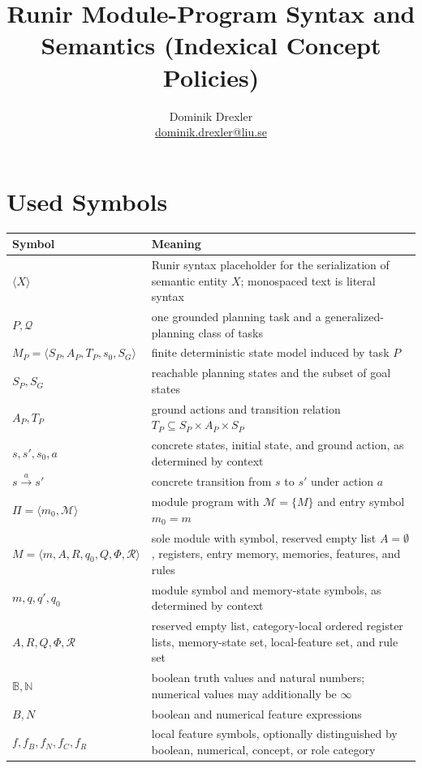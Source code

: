 \documentclass[11pt]{article}
\title{Runir Module-Program Syntax and Semantics (Indexical Concept Policies)}
\author{Dominik Drexler\\\href{mailto:dominik.drexler@liu.se}{dominik.drexler@liu.se}}
\date{}
\newcommand{\meta}[1]{\ensuremath{\langle #1\rangle}}
\newenvironment{compacttable}
  {\begingroup\footnotesize\setlength{\tabcolsep}{3pt}}
  {\endgroup}
\begin{document}
\maketitle

\section{Used Symbols}

\begin{compacttable}
\begin{longtable}{>{\raggedright\arraybackslash}p{}
                  >{\raggedright\arraybackslash}p{}}
\toprule
Symbol & Meaning \\
\midrule
\endhead
\meta{X} & Runir syntax placeholder for the serialization of semantic entity $X$; monospaced text is literal syntax \\
$P,\mathcal Q$ & one grounded planning task and a generalized-planning class of tasks \\
$M_P=\langle S_P,A_P,T_P,s_0,S_G\rangle$ & finite deterministic state model induced by task $P$ \\
$S_P,S_G$ & reachable planning states and the subset of goal states \\
$A_P,T_P$ & ground actions and transition relation $T_P\subseteq S_P\times A_P\times S_P$ \\
$s,s',s_0,a$ & concrete states, initial state, and ground action, as determined by context \\
$s\xrightarrow{a}s'$ & concrete transition from $s$ to $s'$ under action $a$ \\
$\Pi=\langle m_0,\mathcal M\rangle$ & module program with $\mathcal M=\{M\}$ and entry symbol $m_0=m$ \\
$M=\langle m,A,R,q_0,Q,\Phi,\mathcal R\rangle$ & sole module with symbol, reserved empty list $A=\emptyset$, registers, entry memory, memories, features, and rules \\
$m,q,q',q_0$ & module symbol and memory-state symbols, as determined by context \\
$A,R,Q,\Phi,\mathcal R$ & reserved empty list, category-local ordered register lists, memory-state set, local-feature set, and rule set \\
$\mathbb{B},\mathbb{N}$ & boolean truth values and natural numbers; numerical values may additionally be $\infty$ \\
$B,N$ & boolean and numerical feature expressions \\
$f,f_B,f_N,f_C,f_R$ & local feature symbols, optionally distinguished by boolean, numerical, concept, or role category \\

\end{longtable}
\end{compacttable}
\end{document}

